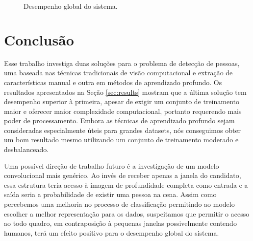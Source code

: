     \begin{figure*}[!t]
    \centering
    \label{fig:result-system-all}
    \hfil
    \label{fig:result-system-all-zoom}
    \caption{Desempenho global do sistema.}
    \label{fig:result-system}
    \end{figure*}

\section{Conclusão}
\label{sec:conclusion}

    Esse trabalho investiga duas soluções para o problema de detecção de pessoas, uma baseada nas técnicas tradicionais de visão computacional e extração de características manual e outra em métodos de aprendizado profundo. Os resultados apresentados na Seção \ref{sec:results} mostram que a última solução tem desempenho superior à primeira, apesar de exigir um conjunto de treinamento maior e oferecer maior complexidade computacional, portanto requerendo mais poder de processamento. Embora as técnicas de aprendizado profundo sejam consideradas especialmente úteis para grandes datasets, nós conseguimos obter um bom resultado mesmo utilizando um conjunto de treinamento moderado e desbalanceado.

    Uma possível direção de trabalho futuro é a investigação de um modelo convolucional mais genérico. Ao invés de receber apenas a janela do candidato, essa estrutura teria acesso à imagem de profundidade completa como entrada e a saída seria a probabilidade de existir uma pessoa na cena. Assim como percebemos uma melhoria no processo de classificação permitindo ao modelo escolher a melhor representação para os dados, suspeitamos que permitir o acesso ao todo quadro, em contraposição à pequenas janelas possivelmente contendo humanos, terá um efeito positivo para o desempenho global do sistema.
